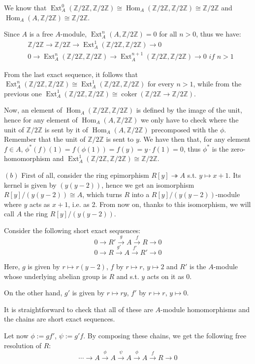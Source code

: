 \documentclass{article}
\newcommand{\numberset}{\mathbb}
\newcommand{\Z}{\numberset{Z}}
\DeclareMathOperator{\Hom}{Hom}
\DeclareMathOperator{\coker}{coker}
\DeclareMathOperator{\Ext}{Ext}
\begin{document}
We know that $\Ext^0_A(\Z/2\Z,\Z/2\Z)\cong \Hom_A(\Z/2\Z,\Z/2\Z)\cong\Z/2\Z$ and
$\Hom_A(A,\Z/2\Z)\cong\Z/2\Z$.

Since $A$ is a free $A$-module, $\Ext^n_A(A,\Z/2\Z)=0$ for all $n>0$, thus we
have:
\begin{align*}
    & \Z/2\Z\rightarrow\Z/2\Z\rightarrow \Ext^1_A(\Z/2\Z,\Z/2\Z)\rightarrow 0 \\
    & 0\rightarrow \Ext^n_A(\Z/2\Z,\Z/2\Z)\rightarrow
    \Ext^{n+1}_A(\Z/2\Z,\Z/2\Z)\rightarrow 0\textit{ if }n>1
\end{align*}

From the last exact sequence, it follows that $\Ext^n_A(\Z/2\Z,\Z/2\Z)\cong
\Ext^1_A(\Z/2\Z,\Z/2\Z)$ for every $n>1$, while from the previous one
$\Ext^1_A(\Z/2\Z,\Z/2\Z)\cong\coker(\Z/2\Z\rightarrow\Z/2\Z)$.

Now, an element of $\Hom_A(\Z/2\Z,\Z/2\Z)$ is defined by the 
image of the unit, hence for any element of $\Hom_A(A,\Z/2\Z)$ we only
have to check where the unit of $\Z/2\Z$ is sent by it of $\Hom_A(A,\Z/2\Z)$ 
precomposed with the $\phi$. Remember that the unit of $\Z/2\Z$ is sent to
$y$. We have then that, for any element $f\in A$,
$\phi^*(f)(1)=f(\phi(1))=f(y)=y\cdot f(1)=0$, thus $\phi^*$ is the
zero-homomorphism and $\Ext^1_A(\Z/2\Z,\Z/2\Z)\cong\Z/2\Z$.

$(b)$ First of all, consider the ring epimorphism $R[y]\twoheadrightarrow A$
s.t. $y\mapsto x+1$. Its kernel is given by $(y(y-2))$, hence we get an
isomorphism $R[y]/(y(y-2))\cong A$, which turns $R$ into a
$R[y]/(y(y-2))$-module where $y$ acts as $x+1$, i.e. as 2. From now on, thanks
to this isomorphism, we will call $A$ the ring $R[y]/(y(y-2))$.

Consider the following short exact sequences:
$$0\rightarrow R'\xrightarrow{g} A\xrightarrow{f} R\rightarrow 0$$
$$0\rightarrow R\xrightarrow{g'} A\xrightarrow{f'} R'\rightarrow 0$$

Here, $g$ is given by $r\mapsto r(y-2)$, $f$ by $r\mapsto r$, $y\mapsto 2$ and
$R'$ is the $A$-module whose underlying abelian group is $R$ and s.t. $y$ acts
on it as 0.

On the other hand, $g'$ is given by $r\mapsto ry$, $f'$ by $r\mapsto r$,
$y\mapsto 0$.

It is straightforward to check that all of these are $A$-module homomorphisms and the
chains are short exact sequences.

Let now $\phi:=gf'$, $\psi:=g'f$. By composing these chains, we get the 
following free resolution of $R$:
$$\cdots\rightarrow A\xrightarrow{\phi} A\xrightarrow{\psi} A\xrightarrow{\phi}
A\xrightarrow{f} R\rightarrow 0$$
\end{document}
